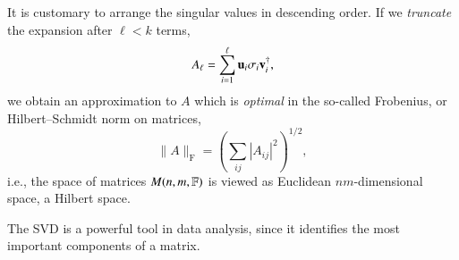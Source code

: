 It is customary to arrange the singular values in descending order. If we \emph{truncate} the expansion after $\ell < k$ terms,
\begin{equation}
    A_\ell = \sum_{i=1}^{\ell} \mathbf{u}_i \sigma_i \mathbf{v}_i^\dag,
\end{equation}
we obtain an approximation to $A$ which is \emph{optimal} in the so-called Frobenius, or Hilbert--Schmidt norm on matrices,
\begin{equation}
    \|A\|_{\text{F}} = \left( \sum_{ij} |A_{ij}|^2 \right)^{1/2},
\end{equation}
i.e., the space of matrices $M(n,m,\mathbb{F})$ is viewed as Euclidean $nm$-dimensional space, a Hilbert space.

The SVD is a powerful tool in data analysis, since it identifies the most important components of a matrix.




